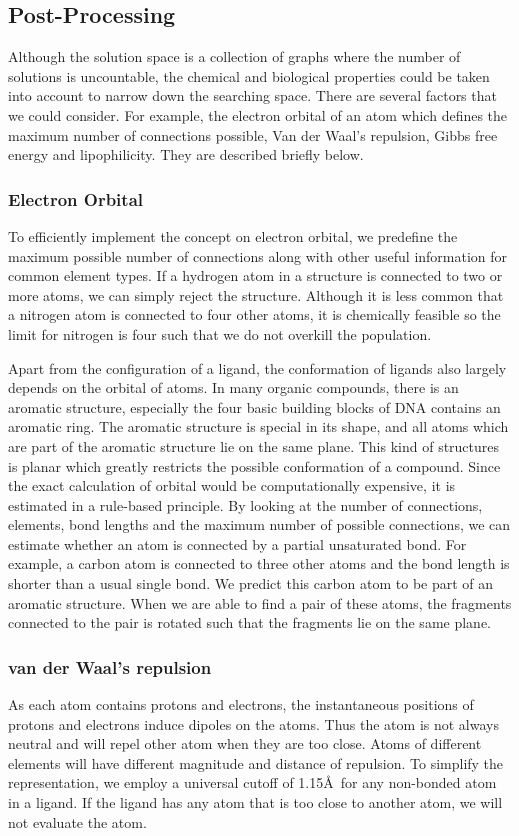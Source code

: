 \documentclass[10pt,conference,letterpaper]{IEEEtran}
\begin{document}
\subsection{Post-Processing}
Although the solution space is a collection of graphs where the number of solutions is uncountable, the chemical and biological properties could be taken into account to narrow down the searching space.
There are several factors that we could consider.
For example, the electron orbital of an atom which defines the maximum number of connections possible, Van der Waal's repulsion, Gibbs free energy and lipophilicity.
They are described briefly below.

\subsubsection{Electron Orbital}
To efficiently implement the concept on electron orbital, we predefine the maximum possible number of connections along with other useful information for common element types.
If a hydrogen atom in a structure is connected to two or more atoms, we can simply reject the structure.
Although it is less common that a nitrogen atom is connected to four other atoms, it is chemically feasible so the limit for nitrogen is four such that we do not overkill the population.

Apart from the configuration of a ligand, the conformation of ligands also largely depends on the orbital of atoms.
In many organic compounds, there is an aromatic structure, especially the four basic building blocks of DNA contains an aromatic ring.
The aromatic structure is special in its shape, and all atoms which are part of the aromatic structure lie on the same plane.
This kind of structures is planar which greatly restricts the possible conformation of a compound. Since the exact calculation of orbital would be computationally expensive, it is estimated in a rule-based principle.
By looking at the number of connections, elements, bond lengths and the maximum number of possible connections, we can estimate whether an atom is connected by a partial unsaturated bond.
For example, a carbon atom is connected to three other atoms and the bond length is shorter than a usual single bond.
We predict this carbon atom to be part of an aromatic structure.
When we are able to find a pair of these atoms, the fragments connected to the pair is rotated such that the fragments lie on the same plane.

\subsubsection{van der Waal's repulsion}
As each atom contains protons and electrons, the instantaneous positions of protons and electrons induce dipoles on the atoms.
Thus the atom is not always neutral and will repel other atom when they are too close. Atoms of different elements will have different magnitude and distance of repulsion.
To simplify the representation, we employ a universal cutoff of 1.15\AA\ for any non-bonded atom in a ligand.
If the ligand has any atom that is too close to another atom, we will not evaluate the atom.
\end{document}
